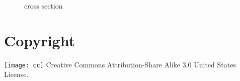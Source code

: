 \begin{figure}
  \centering
  \caption{cross section}
\end{figure}

\section{Copyright}
\texttt{[image: cc]} Creative Commons Attribution-Share Alike 3.0 United States License.





